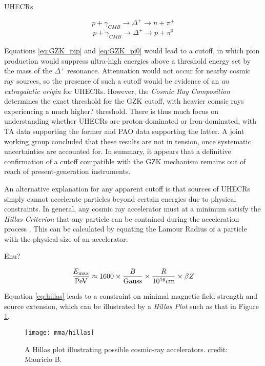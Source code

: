 UHECRs

\begin{equation}
p + \gamma_{CMB} \rightarrow \Delta^{+} \rightarrow n + \pi^{+}
\label{eq:GZK_pip}
\end{equation}
\begin{equation}
p + \gamma_{CMB} \rightarrow \Delta^{+} \rightarrow p + \pi^{0}
\label{eq:GZK_pi0}
\end{equation}

Equations \ref{eq:GZK_pip} and \ref{eq:GZK_pi0} would lead to a cutoff, in which pion production would suppress ultra-high energies above a threshold energy set by the mass of the $\Delta^{+}$ resonance. Attenuation would not occur for nearby cosmic ray sources, so the presence of such a cutoff would be evidence of an \emph{an extragalatic origin} for UHECRs. However, the \emph{Cosmic Ray Composition} determines the exact threshold for the GZK cutoff, with heavier comsic rays experiencing a much higher? threshold. There is thus much focus on understanding whether UHECRs are proton-dominated or Iron-dominated, with TA data supporting the former and PAO data supporting the latter. A joint working group concluded that these results are not in tension, once systematic uncertainties are accounted for. In summary, it appears that a definitive confirmation of a cutoff compatible with the GZK mechanism remains out of reach of present-generation instruments.

An alternative explanation for any apparent cutoff is that sources of UHECRs simply cannot accelerate particles beyond certain energies due to physical constraints. In general, any cosmic ray accelerator must at a minimum satisfy the \emph{Hillas Criterion} that any particle can be contained during the acceleration process . This can be calculated by equating the Lamour Radius of a particle with the physical size of an accelerator:

Enu?

\begin{equation}
\frac{E_{\textup{max}}}{\textup{PeV}} \approx
1600 \times \frac{B}{\textup{Gauss}} \times \frac{R}{10^{16} \textup{cm}} \times
\beta Z
\label{eq:hillas}
\end{equation}

Equation \ref{eq:hillas} leads to a constraint on minimal magnetic field strength and source extension, which can be illustrated by a \emph{Hillas Plot} such as that in Figure \ref{fig:hillas_plot}.

\begin{figure}[!ht]
	\centering \texttt{[image: mma/hillas]}
	\caption{A Hillas plot illustrating possible cosmic-ray accelerators. credit: Mauricio B.}
	\label{fig:hillas_plot}
\end{figure}

